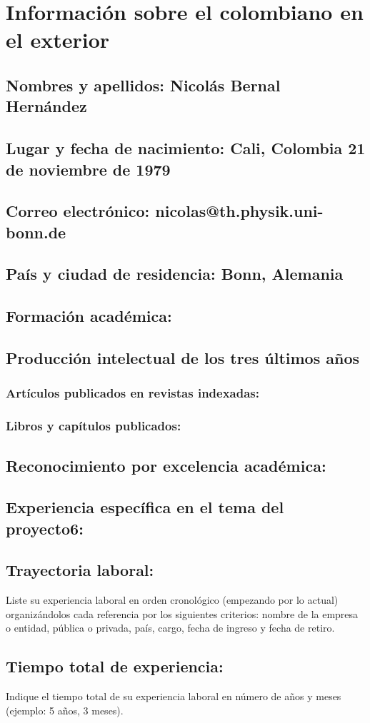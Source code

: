 \section{Información sobre el colombiano en el exterior}
\subsection{Nombres y apellidos: Nicolás Bernal Hernández}
\subsection{Lugar y fecha de nacimiento: Cali, Colombia  21 de noviembre de 1979}
\subsection{Correo electrónico: nicolas@th.physik.uni-bonn.de}
\subsection{País y ciudad de residencia: Bonn, Alemania}
\subsection{Formación académica:}
\subsection{Producción intelectual de los tres últimos años}
\subsubsection{Artículos publicados en revistas indexadas:}
\subsubsection{Libros y capítulos publicados:}
\subsection{Reconocimiento por excelencia académica:}
\subsection{Experiencia específica en el tema del proyecto6:}
\subsection{Trayectoria laboral:}
\begin{instrucciones}
  Liste su experiencia laboral en orden cronológico (empezando por lo
  actual) organizándolos cada referencia por los siguientes criterios:
  nombre de la empresa o entidad, pública o privada, país, cargo,
  fecha de ingreso y fecha de retiro.
\end{instrucciones}
\subsection{Tiempo total de experiencia:}
\begin{instrucciones}
  Indique el tiempo total de su experiencia laboral en número de años
  y meses (ejemplo: 5 años, 3 meses).
\end{instrucciones}


